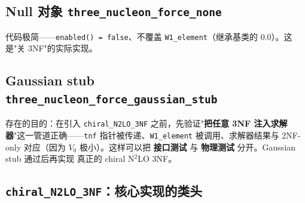 \subsection{Null 对象 \texttt{three\_nucleon\_force\_none}}
\label{subsec:ch15-null}



代码极简——\texttt{enabled() = false}、不覆盖 \texttt{W1\_element}（继承基类的
\(0.0\)）。这是"关 3NF"的实际实现。

\subsection{Gaussian stub \texttt{three\_nucleon\_force\_gaussian\_stub}}
\label{subsec:ch15-stub}



存在的目的：在引入 \texttt{chiral\_N2LO\_3NF} 之前，先验证"\textbf{把任意
3NF 注入求解器}"这一管道正确——\texttt{tnf} 指针被传递、\texttt{W1\_element}
被调用、求解器结果与 2NF-only 对应（因为 \(V_0\) 极小）。这样可以把
\textbf{接口测试} 与 \textbf{物理测试} 分开。Gaussian stub 通过后再实现
真正的 chiral N\(^2\)LO 3NF。

\subsection{\texttt{chiral\_N2LO\_3NF}：核心实现的类头}
\label{subsec:ch15-N2LO-class}



